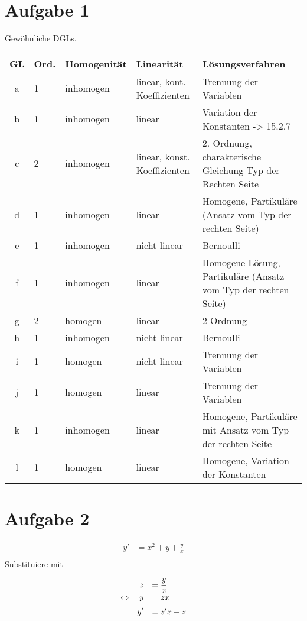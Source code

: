 \documentclass[main.tex]{subfiles}
\begin{document}
\section{Aufgabe 1}

Gewöhnliche DGLs.\\

\begin{tabular}{c|l|l|l|l}
GL & Ord. & Homogenität & Linearität & Lösungsverfahren \\
\hline
a & 1 & inhomogen & linear, kont. Koeffizienten & Trennung der Variablen \\
b & 1 & inhomogen & linear & Variation der Konstanten -> 15.2.7\\
c & 2 & inhomogen & linear, konst. Koeffizienten & 2. Ordnung, charakterische Gleichung Typ der Rechten Seite \\
d & 1 & inhomogen & linear & Homogene, Partikuläre (Ansatz vom Typ der rechten Seite) \\
e & 1 & inhomogen & nicht-linear & Bernoulli \\
f & 1 & inhomogen & linear & Homogene Lösung, Partikuläre (Ansatz vom Typ der rechten Seite) \\
g & 2 & homogen & linear & 2 Ordnung \\
h & 1 & inhomogen & nicht-linear & Bernoulli \\
i & 1 & homogen & nicht-linear & Trennung der Variablen \\
j & 1 & homogen & linear & Trennung der Variablen \\
k & 1 & inhomogen & linear & Homogene, Partikuläre mit Ansatz vom Typ der rechten Seite \\
l & 1 & homogen & linear & Homogene, Variation der Konstanten \\
\end{tabular}

\section{Aufgabe 2}
\begin{align*}
    y' &= x^2 + y + \frac{y}{x} \\
\end{align*}
Substituiere mit

\[\everymath={\displaystyle}\begin{array}{crl}
    & z &= \frac{y}{x} \\
\Leftrightarrow & y &= z x \\[2mm]
    & y' &= z'x + z \\
\end{array}\]
\end{document}
